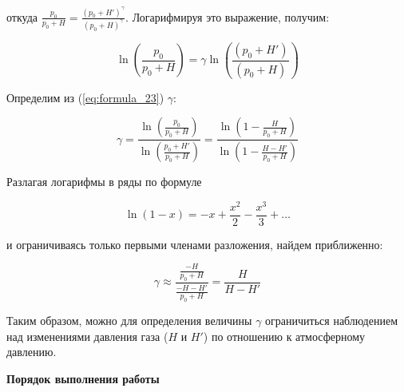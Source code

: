 откуда $\frac{p_0}{p_0 + H} = \frac{\left (p_0 + H' \right )^ \gamma}{\left (p_0 + H \right )^ \gamma}$. Логарифмируя это выражение, получим:

\begin{equation}
    \ln \left (\frac{p_0}{p_0 + H} \right ) = \gamma \ln \left (\frac{\left (p_0 + H' \right )}{\left (p_0 + H \right )} \right )
    \label{eq:formula_23}
\end{equation}

Определим из (\ref{eq:formula_23}) $\gamma$:

\begin{equation}
    \gamma = \frac{\ln \left (\frac{p_0}{p_0 + H} \right )}{\ln \left (\frac{p_0 + H'}{p_0 + H} \right )} = \frac{\ln \left (1 - \frac{H}{p_0 + H} \right )}{\ln \left (1 - \frac{H - H'}{p_0 + H} \right )}
    \label{eq:formula_24}
\end{equation}

Разлагая логарифмы в ряды по формуле

\begin{equation}
    \ln \left (1 - x \right ) = -x + \frac{x^2}{2} - \frac{x^3}{3} + \dots
    \label{eq:formula_25}
\end{equation}

и ограничиваясь только первыми членами разложения, найдем приближенно: 

\begin{equation}
    \gamma \approx \frac{\frac{-H}{p_0 + H}}{\frac{-H - H'}{p_0 + H}} = \frac{H}{H - H'}
    \label{eq:formula_26}
\end{equation}


Таким образом, можно для определения величины $\gamma$ ограничиться наблюдением над изменениями давления газа ($H$ и $H'$) по отношению к атмосферному давлению.

\begin{center}
    \textbf{Порядок выполнения работы}
\end{center}

